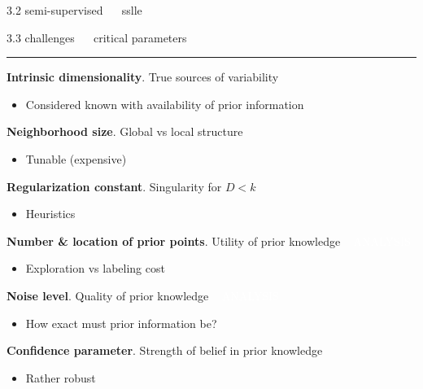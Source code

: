 \documentclass[11pt, compress, t, notes = noshow, xcolor = table, 
aspectratio = 1610]{beamer}
\newcommand{\maketag}[1]{\colorbox{highlightcol}{\textcolor{white}
{\MakeUppercase{#1}}}}
\newcommand{\highlight}[1]{\textcolor{highlightcol}{\textbf{#1}}}
\newcommand{\arritem}{\item[\highlight{$\rightarrow$}]}
\begin{document}
\begin{frame}{\textcolor{gray!90}{3.2 semi-supervised} ~~ sslle}
% 
% 

\end{frame}


\LARGE
\begin{frame}{\textcolor{gray!90}{3.3 challenges} ~~ critical parameters}
\normalsize
\vspace{-0.5cm}
\noindent \textcolor{gray!90}{\rule{\textwidth}{1pt}}
\smallskip

\textbf{Intrinsic dimensionality}. True sources of variability

\begin{itemize}
  \arritem Considered known with availability of prior information
\end{itemize}

\textbf{Neighborhood size}. Global vs local structure

\begin{itemize}
  \arritem Tunable (expensive)
\end{itemize}

\textbf{Regularization constant}. Singularity for $D < k$

\begin{itemize}
  \arritem Heuristics
\end{itemize}

\textbf{Number \& location of prior points}. Utility of prior knowledge ~ 
\maketag{analysis}

\begin{itemize}
  \arritem Exploration vs labeling cost
\end{itemize}

\textbf{Noise level}. Quality of prior knowledge ~ 
\maketag{analysis}

\begin{itemize}
  \arritem How exact must prior information be?
\end{itemize}

\textbf{Confidence parameter}. Strength of belief in prior knowledge 

\begin{itemize}
  \arritem Rather robust
\end{itemize}



\end{frame}
\end{document}
